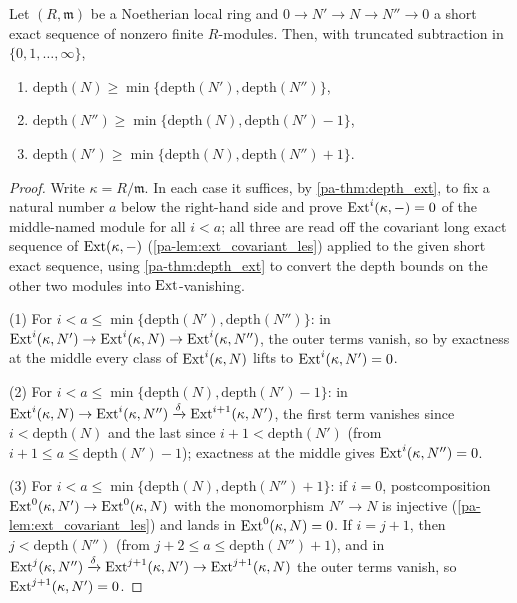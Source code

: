 \begin{theorem}
  \label{pa-thm:depth_ses}
  \leanok

  Let \((R, \mathfrak m)\) be a Noetherian local ring and
  \(0 \to N' \to N \to N'' \to 0\) a short exact sequence of nonzero finite
  \(R\)-modules. Then, with truncated subtraction in \(\{0, 1, \dots, \infty\}\),
  \begin{enumerate}
    \item \(\mathrm{depth}(N) \geq \min\{\mathrm{depth}(N'), \mathrm{depth}(N'')\}\),
    \item \(\mathrm{depth}(N'') \geq \min\{\mathrm{depth}(N), \mathrm{depth}(N') - 1\}\),
    \item \(\mathrm{depth}(N') \geq \min\{\mathrm{depth}(N), \mathrm{depth}(N'') + 1\}\).
  \end{enumerate}
\end{theorem}
\begin{proof}
  \leanok
  Write \(\kappa = R/\mathfrak m\). In each case it suffices, by \ref{pa-thm:depth_ext}, to
  fix a natural number \(a\) below the right-hand side and prove
  \(\operatorname{Ext}^i(\kappa, -) = 0\) of the middle-named module for all \(i < a\); all three are
  read off the covariant long exact sequence of \(\operatorname{Ext}(\kappa, -)\)
  (\ref{pa-lem:ext_covariant_les}) applied to the given short exact sequence, using
  \ref{pa-thm:depth_ext} to convert the depth bounds on the other two modules into
  \(\operatorname{Ext}\)-vanishing.

  (1) For \(i < a \leq \min\{\mathrm{depth}(N'), \mathrm{depth}(N'')\}\): in
  \(\operatorname{Ext}^i(\kappa, N') \to \operatorname{Ext}^i(\kappa, N) \to \operatorname{Ext}^i(\kappa, N'')\), the outer terms
  vanish, so by exactness at the middle every class of \(\operatorname{Ext}^i(\kappa, N)\) lifts to
  \(\operatorname{Ext}^i(\kappa, N') = 0\).

  (2) For \(i < a \leq \min\{\mathrm{depth}(N), \mathrm{depth}(N') - 1\}\): in
  \(\operatorname{Ext}^i(\kappa, N) \to \operatorname{Ext}^i(\kappa, N'') \xrightarrow{\delta}
  \operatorname{Ext}^{i+1}(\kappa, N')\), the first term vanishes since \(i < \mathrm{depth}(N)\) and
  the last since \(i + 1 < \mathrm{depth}(N')\) (from \(i + 1 \leq a \leq
  \mathrm{depth}(N') - 1\)); exactness at the middle gives
  \(\operatorname{Ext}^i(\kappa, N'') = 0\).

  (3) For \(i < a \leq \min\{\mathrm{depth}(N), \mathrm{depth}(N'') + 1\}\): if
  \(i = 0\), postcomposition \(\operatorname{Ext}^0(\kappa, N') \to \operatorname{Ext}^0(\kappa, N)\) with the
  monomorphism \(N' \to N\) is injective (\ref{pa-lem:ext_covariant_les}) and lands in
  \(\operatorname{Ext}^0(\kappa, N) = 0\). If \(i = j + 1\), then \(j < \mathrm{depth}(N'')\) (from
  \(j + 2 \leq a \leq \mathrm{depth}(N'') + 1\)), and in
  \(\operatorname{Ext}^{j}(\kappa, N'') \xrightarrow{\delta} \operatorname{Ext}^{j+1}(\kappa, N') \to
  \operatorname{Ext}^{j+1}(\kappa, N)\) the outer terms vanish, so
  \(\operatorname{Ext}^{j+1}(\kappa, N') = 0\).
\end{proof}

